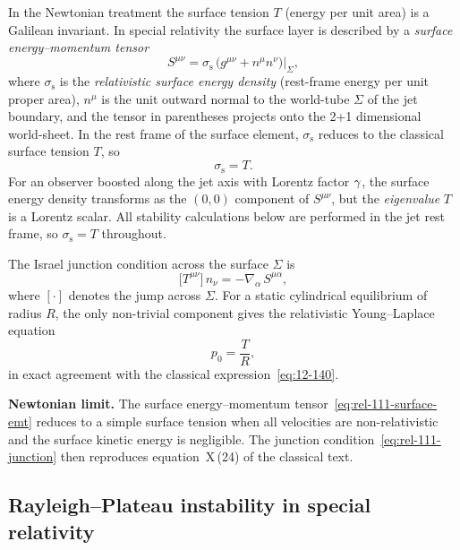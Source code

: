 In the Newtonian treatment the surface tension $T$ (energy per unit
area) is a Galilean invariant.  In special relativity the surface
layer is described by a \emph{surface energy--momentum tensor}
\begin{equation}
\label{eq:rel-111-surface-emt}
S^{\mu\nu} = \sigma_{\mathrm{s}}\,
  \bigl(g^{\mu\nu} + n^{\mu}n^{\nu}\bigr)\Big|_{\Sigma},
\end{equation}
where $\sigma_{\mathrm{s}}$ is the \emph{relativistic surface energy
density} (rest-frame energy per unit proper area), $n^{\mu}$ is the
unit outward normal to the world-tube $\Sigma$ of the jet boundary,
and the tensor in parentheses projects onto the 2+1 dimensional
world-sheet.  In the rest frame of the surface element,
$\sigma_{\mathrm{s}}$ reduces to the classical surface tension $T$,
so
\begin{equation}
\label{eq:rel-111-sigma-rest}
\sigma_{\mathrm{s}} = T.
\end{equation}
For an observer boosted along the jet axis with Lorentz factor
$\gamma$, the surface energy density transforms as the $(0,0)$
component of $S^{\mu\nu}$, but the \emph{eigenvalue} $T$ is a
Lorentz scalar.  All stability calculations below are performed in
the jet rest frame, so $\sigma_{\mathrm{s}} = T$ throughout.

The Israel junction condition across the surface $\Sigma$ is
\begin{equation}
\label{eq:rel-111-junction}
\bigl[T^{\mu\nu}\bigr]\,n_{\nu}
  = -\nabla_{\alpha}\,S^{\mu\alpha},
\end{equation}
where $[\cdot]$ denotes the jump across $\Sigma$.  For a static
cylindrical equilibrium of radius $R$, the only non-trivial
component gives the relativistic Young--Laplace equation
\begin{equation}
\label{eq:rel-111-young-laplace}
p_{0} = \frac{T}{R},
\end{equation}
in exact agreement with the classical expression~\eqref{eq:12-140}.

\begin{relcorrection}
\textbf{Newtonian limit.}
The surface energy--momentum tensor~\eqref{eq:rel-111-surface-emt}
reduces to a simple surface tension when all velocities are
non-relativistic and the surface kinetic energy is negligible.
The junction condition~\eqref{eq:rel-111-junction} then reproduces
equation~X\,(24) of the classical text.
\end{relcorrection}

\subsection{Rayleigh--Plateau instability in special relativity}
\label{sec:rel-111-RP}


